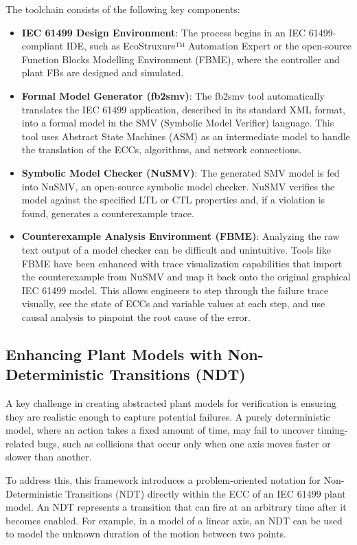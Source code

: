 The toolchain consists of the following key components:

\begin{itemize}
\item \textbf{IEC 61499 Design Environment}: The process begins in an IEC 61499-compliant IDE, such as EcoStruxure™ Automation Expert or the open-source Function Blocks Modelling Environment (FBME), where the controller and plant FBs are designed and simulated.

\item \textbf{Formal Model Generator (fb2smv)}: The fb2smv tool automatically translates the IEC 61499 application, described in its standard XML format, into a formal model in the SMV (Symbolic Model Verifier) language. This tool uses Abstract State Machines (ASM) as an intermediate model to handle the translation of the ECCs, algorithms, and network connections.

\item \textbf{Symbolic Model Checker (NuSMV)}: The generated SMV model is fed into NuSMV, an open-source symbolic model checker. NuSMV verifies the model against the specified LTL or CTL properties and, if a violation is found, generates a counterexample trace.

\item \textbf{Counterexample Analysis Environment (FBME)}: Analyzing the raw text output of a model checker can be difficult and unintuitive. Tools like FBME have been enhanced with trace visualization capabilities that import the counterexample from NuSMV and map it back onto the original graphical IEC 61499 model. This allows engineers to step through the failure trace visually, see the state of ECCs and variable values at each step, and use causal analysis to pinpoint the root cause of the error.
\end{itemize}

\subsection{Enhancing Plant Models with Non-Deterministic Transitions (NDT)}

A key challenge in creating abstracted plant models for verification is ensuring they are realistic enough to capture potential failures. A purely deterministic model, where an action takes a fixed amount of time, may fail to uncover timing-related bugs, such as collisions that occur only when one axis moves faster or slower than another.

To address this, this framework introduces a problem-oriented notation for Non-Deterministic Transitions (NDT) directly within the ECC of an IEC 61499 plant model. An NDT represents a transition that can fire at an arbitrary time after it becomes enabled. For example, in a model of a linear axis, an NDT can be used to model the unknown duration of the motion between two points.

